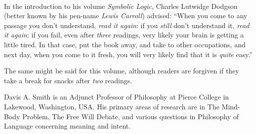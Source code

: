 \clearpage
\thispagestyle{empty}
\pagecolor{lyallpink}\afterpage{\nopagecolor}

\vfill
\ 
\parbox{3 in}{\color{white}
In the introduction to his volume \emph{Symbolic Logic}, Charles Lutwidge Dodgson (better known by his pen-name \emph{Lewis Carroll}) advised: ``When you come to any passage you don't understand, \emph{read it again}: if you \emph{still} don't understand it, \emph{read it again}: if you fail, even after \emph{three} readings, very likely your brain is getting a little tired. In that case, put the book away, and take to other occupations, and next day, when you come to it fresh, you will very likely find that it is \emph{quite} easy.''

\medskip

The same might be said for this volume, although readers are forgiven if they take a break for snacks after \emph{two} readings.
}

\vfill

\parbox{3 in}{\color{white}
Davis A. Smith is an Adjunct Professor of Philosophy at Pierce College in Lakewood, Washington, USA. His primary areas of research are in The Mind-Body Problem, The Free Will Debate, and various questions in Philosophy of Language concerning meaning and intent. 
}
